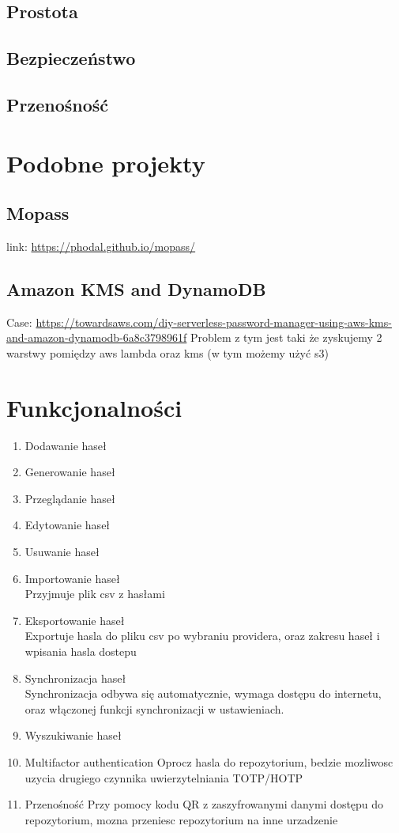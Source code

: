 \documentclass[11pt, a4paper]{article}
\begin{document}
\subsection{Prostota}
\subsection{Bezpieczeństwo}
\subsection{Przenośność}

\section{Podobne projekty}

\subsection{Mopass}
link: \url{https://phodal.github.io/mopass/}


\subsection{Amazon KMS and DynamoDB}
Case: \url{https://towardsaws.com/diy-serverless-password-manager-using-aws-kms-and-amazon-dynamodb-6a8c3798961f}
Problem z tym jest taki że zyskujemy 2 warstwy pomiędzy aws lambda oraz kms (w tym możemy użyć s3)


\section{Funkcjonalności}
\begin{enumerate}
    \item Dodawanie haseł
    \item Generowanie haseł
    \item Przeglądanie haseł
    \item Edytowanie haseł
    \item Usuwanie haseł
    \item Importowanie haseł \\
    Przyjmuje plik csv z hasłami
    \item Eksportowanie haseł \\
    Exportuje hasla do pliku csv po wybraniu providera, oraz zakresu haseł i wpisania hasla dostepu
    \item Synchronizacja haseł \\
    Synchronizacja odbywa się automatycznie, wymaga dostępu do internetu, oraz włączonej funkcji synchronizacji w ustawieniach.
    \item Wyszukiwanie haseł
    \item Multifactor authentication
    Oprocz hasla do repozytorium, bedzie mozliwosc uzycia drugiego czynnika uwierzytelniania TOTP/HOTP
    \item Przenośność
    Przy pomocy kodu QR z zaszyfrowanymi danymi dostępu do repozytorium, mozna przeniesc repozytorium na inne urzadzenie 
\end{enumerate}
\end{document}
